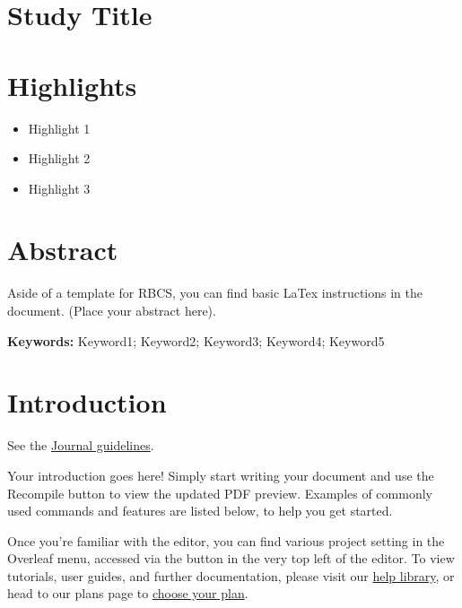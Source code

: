 \documentclass[a4paper,12pt,twoside]{article}
\begin{document}
\raggedright %


\section*{Study Title}

\section*{Highlights}
\begin{itemize}
\item Highlight 1
\item Highlight 2
\item Highlight 3
\end{itemize}



\section*{Abstract}
Aside of a template for RBCS, you can find basic LaTex instructions in the document. (Place your abstract here).

\vspace{0.5cm}

\textbf{Keywords:} Keyword1; Keyword2; Keyword3; Keyword4; Keyword5



\section{Introduction}

See the \href{https://www.rbcsjournal.org/instructions-to-authors/}{Journal guidelines}.

Your introduction goes here! Simply start writing your document and use the Recompile button to view the updated PDF preview. Examples of commonly used commands and features are listed below, to help you get started.

Once you're familiar with the editor, you can find various project setting in the Overleaf menu, accessed via the button in the very top left of the editor. To view tutorials, user guides, and further documentation, please visit our \href{https://www.overleaf.com/learn}{help library}, or head to our plans page to \href{https://www.overleaf.com/user/subscription/plans}{choose your plan}.
\end{document}
